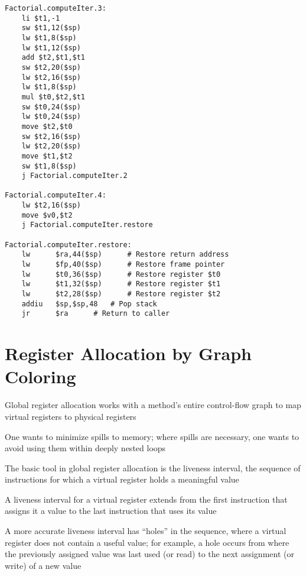 \documentclass[8pt,a4paper,compress]{beamer}
\begin{document}
\begin{frame}[fragile]
\pause

\begin{lstlisting}[language={}]
Factorial.computeIter.3:
    li $t1,-1
    sw $t1,12($sp)
    lw $t1,8($sp)
    lw $t1,12($sp)
    add $t2,$t1,$t1
    sw $t2,20($sp)
    lw $t2,16($sp)
    lw $t1,8($sp)
    mul $t0,$t2,$t1
    sw $t0,24($sp)
    lw $t0,24($sp)
    move $t2,$t0
    sw $t2,16($sp)
    lw $t2,20($sp)
    move $t1,$t2
    sw $t1,8($sp)
    j Factorial.computeIter.2

Factorial.computeIter.4:
    lw $t2,16($sp)
    move $v0,$t2
    j Factorial.computeIter.restore

Factorial.computeIter.restore:
    lw      $ra,44($sp) 	 # Restore return address
    lw      $fp,40($sp) 	 # Restore frame pointer
    lw      $t0,36($sp) 	 # Restore register $t0
    lw      $t1,32($sp) 	 # Restore register $t1
    lw      $t2,28($sp) 	 # Restore register $t2
    addiu   $sp,$sp,48 	 # Pop stack
    jr      $ra 	 # Return to caller
\end{lstlisting}
\end{frame}

\section{Register Allocation by Graph Coloring}
\begin{frame}[fragile]
\pause

Global register allocation works with a method's entire control-flow graph to map virtual registers to physical registers

\pause
\bigskip

One wants to minimize spills to memory; where spills are necessary, one wants to avoid using them within deeply nested loops

\pause
\bigskip

The basic tool in global register allocation is the liveness interval, the sequence of instructions for which a virtual register holds a meaningful value

\pause
\bigskip

A liveness interval for a virtual register extends from the first instruction that assigns it a value to the last instruction that uses its value

\pause
\bigskip

A more accurate liveness interval has ``holes'' in the sequence, where a virtual register does not contain a useful value; for example, a hole occurs from where the previously assigned value
was last used (or read) to the next assignment (or write) of a new value
\end{frame}
\end{document}

